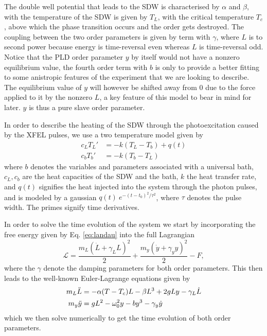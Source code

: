 The double well potential that leads to the SDW is characterised by $\alpha$ and $\beta$, with the temperature of the SDW is given by $T_L$, with the critical temperature $T_c$, above which the phase transition occurs and the order gets destroyed. The coupling between the two order parameters is given by term with $\gamma$, where $L$ is to second power because energy is time-reversal even whereas $L$ is time-reversal odd. Notice that the PLD order parameter $y$ by itself would not have a nonzero equilibrium value, the fourth order term with $b$ is only to provide a better fitting to some anistropic features of the experiment that we are looking to describe. The equilibrium value of $y$ will however be shifted away from 0 due to the force applied to it by the nonzero $L$, a key feature of this model to bear in mind for later. $y$ is thus a pure slave order parameter.

In order to describe the heating of the SDW through the photoexcitation caused by the XFEL pulses, we use a two temperature model given by
\begin{align}
	c_L T_L' &= -k(T_L - T_b) + q(t) \\
	c_b T_b' &= -k(T_b - T_L)
\end{align}
where $b$ denotes the variables and parameters associated with a universal bath, $c_L, c_b$ are the heat capacities of the SDW and the bath, $k$ the heat transfer rate, and $q(t)$ signifies the heat injected into the system through the photon pulses, and is modeled by a gaussian $q(t) ~ e^{-(t-t_0)^2/\tau^2}$, where $\tau$ denotes the pulse width. The primes signify time derivatives.

In order to solve the time evolution of the system we start by incorporating the free energy given by Eq. \ref{eq:landau} into the full Lagrangian
\begin{equation}
    \mathcal{L} = \frac{m_L (\dot{L} + \gamma_L L)^2}{2} + \frac{m_y (\dot{y} + \gamma_y y)^2}{2} - F,
\end{equation}
where the $\gamma$ denote the damping parameters for both order parameters. This then leads to the well-known Euler-Lagrange equations given by
\begin{align}
    m_L \Ddot{L} &= -\alpha(T-T_c)L - \beta L^3 + 2g L y - \gamma_L \dot{L} \label{eq:L_diffeq}\\
    m_y \Ddot{y} &=gL^2 -\omega_0^2 y  - b y^3 - \gamma_y \dot{y} 
\end{align}
which we then solve numerically to get the time evolution of both order parameters.
